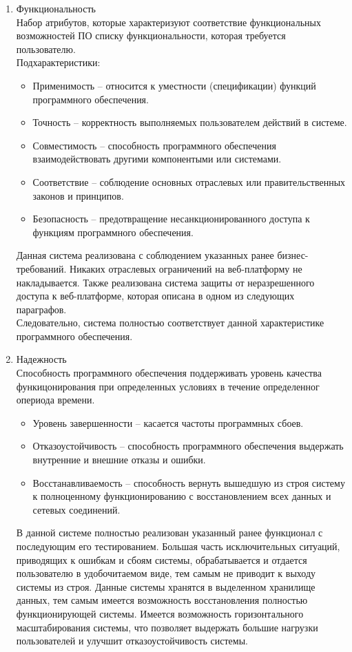 \documentclass[a4paper,14pt]{extreport} %
\begin{document}
\begin{enumerate}
\item Функциональность \\
Набор атрибутов, которые характеризуют соответствие функциональных возможностей ПО списку функциональности, которая требуется пользователю. \\
Подхарактеристики:
\begin{itemize}
\item Применимость -- относится к уместности (спецификации) функций программного обеспечения.
\item Точность -- корректность выполняемых пользователем действий в системе.
\item Совместимость -- способность программного обеспечения взаимодействовать другими компонентыми или системами.
\item Соответствие -- соблюдение основных отраслевых  или правительственных законов и принципов.
\item Безопасность -- предотвращение несанкционированного доступа к функциям программного обеспечения.
\end{itemize}
Данная система реализована с соблюдением указанных ранее бизнес-требований. Никаких отраслевых ограничений на веб-платформу не накладывается. Также реализована система защиты от неразрешенного доступа к веб-платформе, которая описана в одном из следующих параграфов.
\\
Следовательно, система полностью соответствует данной характеристике программного обеспечения.
\item Надежность \\
Способность программного обеспечения поддерживать уровень качества функицонирования при определенных условиях в течение определенног опериода времени.
\begin{itemize}
\item Уровень завершенности -- касается частоты программных сбоев.
\item Отказоустойчивость -- способность программного обеспечения выдержать внутренние и внешние отказы и ошибки.
\item Восстанавливаемость -- способность вернуть вышедшую из строя систему к полноценному функционированию с восстановлением всех данных и сетевых соединений.
\end{itemize}
В данной системе полностью реализован указанный ранее функционал с последующим его тестированием. Большая часть исключительных ситуаций, приводящих к ошибкам и сбоям системы, обрабатывается и отдается пользователю в удобочитаемом виде, тем самым не приводит к выходу системы из строя. Данные системы хранятся в выделенном хранилище данных, тем самым имеется возможность восстановления полностью функционирующей системы. Имеется возможность горизонтального масштабирования системы, что позволяет выдержать большие нагрузки пользователей и улучшит отказоустойчивость системы. \\

\end{enumerate}
\end{document}
